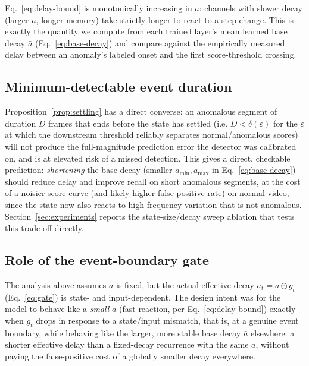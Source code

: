 Eq.~\ref{eq:delay-bound} is monotonically increasing in $a$: channels
with slower decay (larger $a$, longer memory) take strictly longer to
react to a step change. This is exactly the quantity we compute from
each trained layer's mean learned base decay $\bar{a}$
(Eq.~\ref{eq:base-decay}) and compare against the empirically measured
delay between an anomaly's labeled onset and the first score-threshold
crossing.

\subsection{Minimum-detectable event duration}
\label{sec:theory-min-duration}
Proposition~\ref{prop:settling} has a direct converse: an anomalous
segment of duration $D$ frames that ends before the state has settled
(i.e. $D < \delta(\varepsilon)$ for the $\varepsilon$ at which the
downstream threshold reliably separates normal/anomalous scores) will
not produce the full-magnitude prediction error the detector was
calibrated on, and is at elevated risk of a missed detection. This gives
a direct, checkable prediction: \emph{shortening} the base decay (smaller
$a_{\min}, a_{\max}$ in Eq.~\ref{eq:base-decay}) should reduce delay and
improve recall on short anomalous segments, at the cost of a noisier
score curve (and likely higher false-positive rate) on normal video,
since the state now also reacts to high-frequency variation that is not
anomalous. Section~\ref{sec:experiments} reports the state-size/decay
sweep ablation that tests this trade-off directly.

\subsection{Role of the event-boundary gate}
\label{sec:theory-gating}
The analysis above assumes $a$ is fixed, but the actual effective decay $a_t = \bar a \odot g_t$ (Eq.~\ref{eq:gate}) is state- and input-dependent. The design intent was for the model to behave like a \emph{small} $a$ (fast reaction, per Eq.~\ref{eq:delay-bound}) exactly when $g_t$ drops in response to a state/input mismatch, that is, at a genuine event boundary, while behaving like the larger, more stable base decay $\bar a$ elsewhere: a shorter effective delay than a fixed-decay recurrence with the same $\bar a$, without paying the false-positive cost of a globally smaller decay everywhere.

